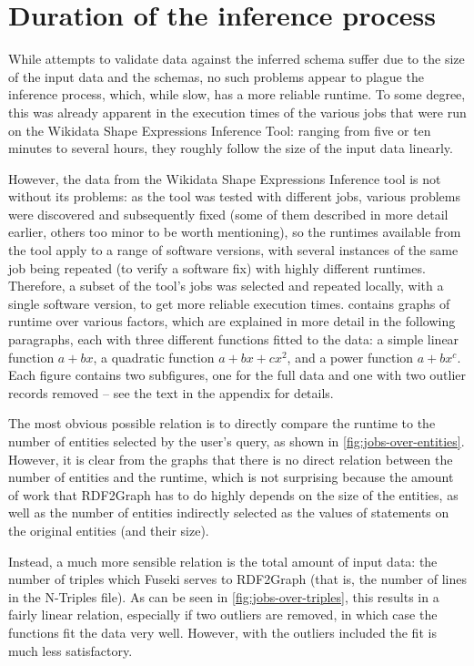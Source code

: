 \section{Duration of the inference process}
\label{sec:Evaluation:duration}

While attempts to validate data against the inferred schema
suffer due to the size of the input data and the schemas,
no such problems appear to plague the inference process,
which, while slow, has a more reliable runtime.
To some degree, this was already apparent in the execution times
of the various jobs that were run on the Wikidata Shape Expressions Inference Tool:
ranging from five or ten minutes to several hours,
they roughly follow the size of the input data linearly.

However, the data from the Wikidata Shape Expressions Inference tool
is not without its problems:
as the tool was tested with different jobs,
various problems were discovered and subsequently fixed
(some of them described in more detail earlier, others too minor to be worth mentioning),
so the runtimes available from the tool apply to a range of software versions,
with several instances of the same job being repeated (to verify a software fix)
with highly different runtimes.
Therefore, a subset of the tool’s jobs was selected
and repeated locally, with a single software version,
to get more reliable execution times.
 contains graphs of runtime over various factors,
which are explained in more detail in the following paragraphs,
each with three different functions fitted to the data:
a simple linear function $a+bx$,
a quadratic function $a+bx+cx^2$,
and a power function $a+bx^c$.
Each figure contains two subfigures,
one for the full data and one with two outlier records removed –
see the text in the appendix for details.

The most obvious possible relation is
to directly compare the runtime to the number of entities selected by the user’s query,
as shown in \cref{fig:jobs-over-entities}.
However, it is clear from the graphs that there is no direct relation
between the number of entities and the runtime,
which is not surprising because the amount of work that RDF2Graph has to do
highly depends on the size of the entities,
as well as the number of entities indirectly selected as the values of statements on the original entities (and their size).

Instead, a much more sensible relation is the total amount of input data:
the number of triples which Fuseki serves to RDF2Graph
(that is, the number of lines in the N-Triples file). %
As can be seen in \cref{fig:jobs-over-triples},
this results in a fairly linear relation,
especially if two outliers are removed,
in which case the functions fit the data very well.
However, with the outliers included the fit is much less satisfactory.

